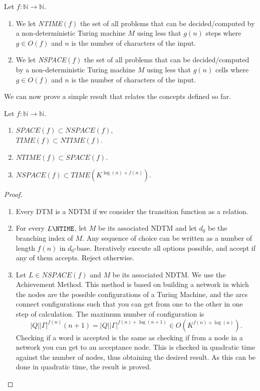 \begin{definition}
  Let $f: \mathbb{N}\to  \mathbb{N}$.
\begin{enumerate}
  \item We let \emph{NTIME}$(f)$  the set of all problems that can be decided/computed by a non-deterministic Turing machine $M$ using less that $g(n)$ steps where $g\in O(f)$ and $n$ is the number of characters of the input.  
  \item We let \emph{NSPACE}$(f)$  the set of all problems that can be decided/computed by a non-deterministic Turing machine $M$ using less that $g(n)$ cells where $g\in O(f)$ and $n$ is the number of characters of the input.  
\end{enumerate}
\end{definition}
  
We can now prove a simple result that relates the concepts defined so far.

\begin{theorem}
  Let $f: \mathbb{N}\to  \mathbb{N}$.
  \begin{enumerate}
  \item $SPACE(f) \subset NSPACE(f)$,\\
    $TIME(f) \subset NTIME(f)$.
  \item $NTIME(f) \subset SPACE(f)$.
  \item $NSPACE(f) \subset TIME(K^{ \log(n)+ f(n)} )$.
  \end{enumerate}
\end{theorem}
\begin{proof}\hfill
  \begin{enumerate}
  \item Every DTM is a NDTM if we consider the transition function as a relation.
  \item For every $L\NTIME$, let $M$ be its associated NDTM and let $d_0$ be the branching index of $M$. Any sequence of choice can be written as a number of length $f(n)$ in $d_0$-base. Iteratively execute all options possible, and accept if any of them accepts. Reject otherwise.
  \item Let $L \in NSPACE(f)$ and $M$ be its associated NDTM. We use the Achievement Method. This method is based on building a network in which the nodes are the possible configurations of a Turing Machine, and the arcs connect configurations such that you can get from one to the other in one step of calculation. The maximum number of configuration is $$|Q||\Gamma|^{f(n)} (n + 1) = |Q||\Gamma|^{f(n)+\log(n + 1)} \in O (K^{f(n)+\log(n)}).$$
Checking if a word is accepted is the same as checking if from a node in a network you can get to an acceptance node. This is checked in quadratic time against the number of nodes, thus obtaining the desired result. As this can be done in quadratic time, the result is proved.
  \end{enumerate}
\end{proof}

